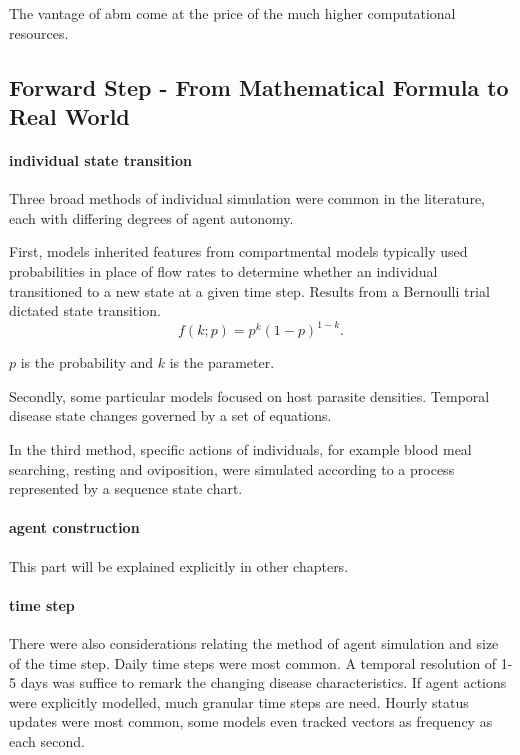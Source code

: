 \documentclass[a4paper, 12pt, twoside]{article}
\begin{document}
The vantage of \gls{abm} come at the price of the much higher computational resources.

\subsection{Forward Step - From Mathematical Formula to Real World}

\paragraph{individual state transition}%
\label{par:individual_state_transition}
Three broad methods of individual simulation were common in the literature, each with differing degrees of agent autonomy.

First, models inherited features from compartmental models typically used probabilities in place of flow rates to determine whether an individual transitioned to a new state at a given time step.
Results from a Bernoulli trial dictated state transition.
\[
  f(k;p) = p^k ( 1 - p )^{1 - k}
.\] 

$p$ is the probability and  $k$ is the parameter.

Secondly, some particular models focused on host parasite densities.
Temporal disease state changes governed by a set of equations.

In the third method, specific actions of individuals, for example blood meal searching, resting and oviposition, were simulated according to a process represented by a sequence state chart.

\paragraph{agent construction}%
\label{par:agent_construction}
This part will be explained explicitly in other chapters.

\paragraph{time step}%
\label{par:time_step}
There were also considerations relating the method of agent simulation and size of the time step.
Daily time steps were most common.
A temporal resolution of 1-5 days was suffice to remark the changing disease characteristics.
If agent actions were explicitly modelled, much granular time steps are need.
Hourly status updates were most common, some models even tracked vectors as frequency as each second.
\end{document}

